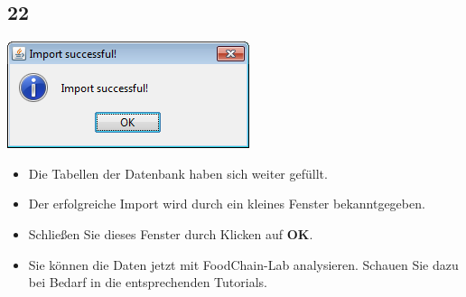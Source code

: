 \documentclass{beamer}
\begin{document}
\subsection{22}
\begin{frame}
	\begin{center}
  		\includegraphics[height=0.3\textheight]{22.png}
	\end{center}
	\begin{itemize}
		\item Die Tabellen der Datenbank haben sich weiter gefüllt.
		\item Der erfolgreiche Import wird durch ein kleines Fenster  bekanntgegeben.
		\item Schließen Sie dieses Fenster durch Klicken auf \textbf{OK}.
		\item Sie können die Daten jetzt mit FoodChain-Lab analysieren. Schauen Sie dazu bei Bedarf in die entsprechenden Tutorials.
	\end{itemize}
\end{frame}
\end{document}
